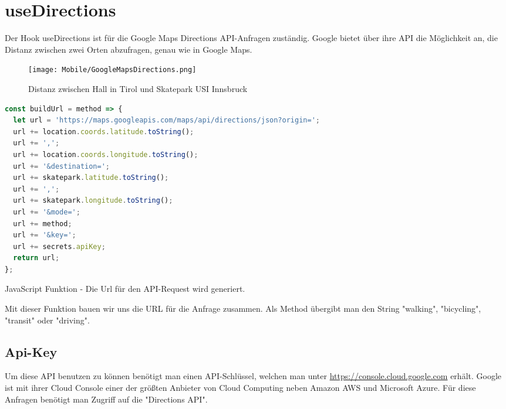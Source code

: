 \section{useDirections}
Der Hook useDirections ist für die Google Maps Directions API-Anfragen zuständig. Google bietet über
ihre API die Möglichkeit an, die Distanz zwischen zwei Orten abzufragen, genau wie in Google Maps.

\begin{figure}[H]
  \begin{center}
    \texttt{[image: Mobile/GoogleMapsDirections.png]}
    \caption{Distanz zwischen Hall in Tirol und Skatepark USI Innsbruck}
  \end{center}
\end{figure}

\begin{code}[htp]
\begin{lstlisting}[firstnumber=1,language=JavaScript, style=JSX]
const buildUrl = method => {
  let url = 'https://maps.googleapis.com/maps/api/directions/json?origin=';
  url += location.coords.latitude.toString();
  url += ',';
  url += location.coords.longitude.toString();
  url += '&destination=';
  url += skatepark.latitude.toString();
  url += ',';
  url += skatepark.longitude.toString();
  url += '&mode=';
  url += method;
  url += '&key=';
  url += secrets.apiKey;
  return url;
};
\end{lstlisting}
\caption{JavaScript Funktion - Die Url für den API-Request wird generiert.}
\end{code}

Mit dieser Funktion bauen wir uns die URL für die Anfrage zusammen. Als Method übergibt man den
String "walking", "bicycling", "transit"{ }oder "driving".

\subsection{Api-Key}
\label{apikey}
Um diese API benutzen zu können benötigt man einen API-Schlüssel, welchen man unter
\url{https://console.cloud.google.com} erhält. Google ist mit ihrer Cloud Console einer der größten
Anbieter von Cloud Computing neben Amazon AWS und Microsoft Azure. Für diese Anfragen benötigt man
Zugriff auf die "Directions API".
